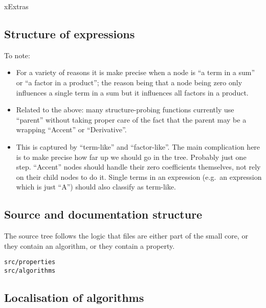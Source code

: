 \documentclass[11pt]{article}
\begin{document}
xExtras

\subsection{Structure of expressions}

To note:
\begin{itemize}
\item For a variety of reasons it is make precise when a node is ``a
  term in a sum'' or ``a factor in a product''; the reason being that
  a node being zero only influences a single term in a sum but it
  influences all factors in a product. 

\item Related to the above: many structure-probing functions currently
  use ``parent'' without taking proper care of the fact that the
  parent may be a wrapping ``Accent'' or ``Derivative''. 

\item This is captured by ``term-like'' and ``factor-like''. The main
  complication here is to make precise how far up we should go in the
  tree. Probably just one step. ``Accent'' nodes should handle their
  zero coefficients themselves, not rely on their child nodes to do
  it. Single terms in an expression (e.g.~an expression which is just
  ``A'') should also classify as term-like.
\end{itemize}

\subsection{Source and documentation structure}

The source tree follows the logic that files are either part of the
small core, or they contain an algorithm, or they contain a property. 
\begin{verbatim}
src/properties
src/algorithms
\end{verbatim}

\subsection{Localisation of algorithms}
\end{document}
